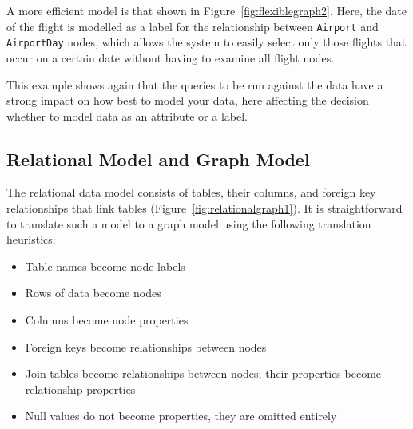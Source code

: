 A more efficient model is that shown in Figure~\ref{fig:flexiblegraph2}. Here, the date of the flight is modelled as a label for the relationship between \texttt{Airport} and \texttt{AirportDay} nodes, which allows the system to easily select only those flights that occur on a certain date without having to examine all flight nodes. 

This example shows again that the queries to be run against the data have a strong impact on how best to model your data, here affecting the decision whether to model data as an attribute or a label.

\subsection*{Relational Model and Graph Model}

The relational data model consists of tables, their columns, and foreign key relationships that link tables (Figure~\ref{fig:relationalgraph1}). It is straightforward to translate such a model to a graph model using the following translation heuristics:

\begin{itemize}
  \item Table names become node labels
  \item Rows of data become nodes
  \item Columns become node properties
  \item Foreign keys become relationships between nodes
  \item Join tables become relationships between nodes; their properties become relationship properties
  \item Null values do not become properties, they are omitted entirely
\end{itemize}

